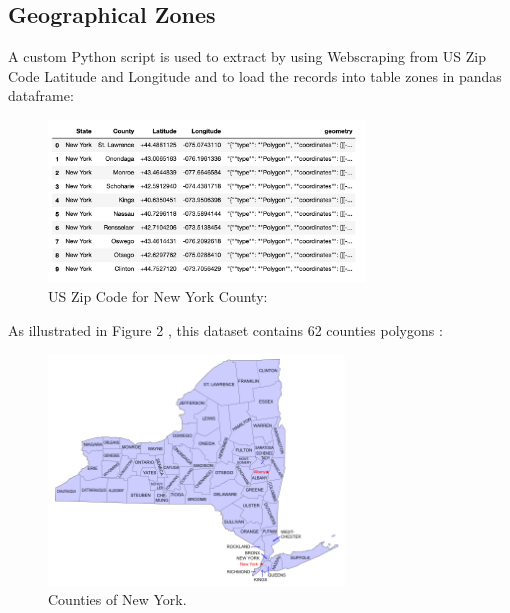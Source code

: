 \documentclass{article}
\begin{document}
\subsection{Geographical Zones}
A custom Python script is used to extract by using Webscraping  from US Zip Code Latitude and Longitude and to load the records into table zones in pandas dataframe:
\begin{figure}[h]
 \centering
\includegraphics[width=0.75\textwidth]{geodata.png}
 \caption{US Zip Code for New York County:}
\end{figure}

As illustrated in  Figure 2 , this dataset contains 62 counties polygons :
\begin{figure}[h]
 \centering
\includegraphics[width=0.7\textwidth]{NY.png}
 \caption{Counties of New York.}
\end{figure}
\end{document}
